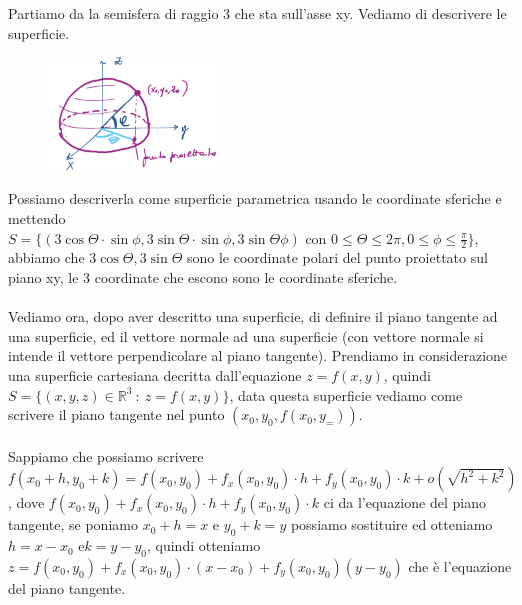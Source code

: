 \begin{example}
Partiamo da la semisfera di raggio 3 che sta sull'asse xy. Vediamo di descrivere le superficie.\\
\end{example}
\begin{figure}
    \vspace{-25pt}
    \centering
    \includegraphics[width=4.5cm]{images/ess-legamu-defi-2.png}
\end{figure}
\hspace{-15pt}Possiamo descriverla come superficie parametrica usando le coordinate sferiche e mettendo $S = \{(3\cos{\Theta} \cdot \sin{\phi}, 3\sin{\Theta}\cdot\sin{\phi}, 3\sin{\Theta}\phi) \text{ con }0\leq \Theta \leq 2\pi, 0\leq \phi \leq \frac{\pi}{2}\}$, abbiamo che $3\cos{\Theta}, 3\sin{\Theta}$ sono le coordinate polari del punto proiettato sul piano xy, le 3 coordinate che escono sono le coordinate sferiche.\\\\


\hspace{-15pt}Vediamo ora, dopo aver descritto una superficie, di definire il piano tangente ad una superficie, ed il vettore normale ad una superficie (con vettore normale si intende il vettore perpendicolare al piano tangente). Prendiamo in considerazione una superficie cartesiana decritta dall'equazione $z = f(x,y)$, quindi $S = \{(x,y,z) \in \mathbb{R}^3 \::\: z = f(x,y)\}$, data questa superficie vediamo come scrivere il piano tangente nel punto $(x_0,y_0,f(x_0,y_=))$. \\\\
Sappiamo che possiamo scrivere $f(x_0 + h, y_0 + k) = f(x_0, y_0) + f_x(x_0,y_0) \cdot h + f_y(x_0,y_0) \cdot k + o(\sqrt{h^2 + k^2})$, dove $f(x_0, y_0) + f_x(x_0,y_0) \cdot h + f_y(x_0,y_0) \cdot k$ ci da l'equazione del piano tangente, se poniamo $x_0 + h = x$ e $y_0 + k = y$ possiamo sostituire ed otteniamo $h = x - x_0$ e$k = y - y_0$, quindi otteniamo $z = f(x_0,y_0) + f_x(x_0,y_0) \cdot (x-x_0) + f_y(x_0,y_0)(y-y_0)$ che è l'equazione del piano tangente.\\

